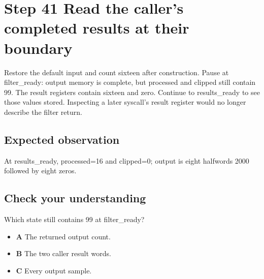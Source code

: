 \section{Step 41 Read the caller’s completed results at their boundary}\label{fir-s41}

Restore the default input and count sixteen after construction. Pause at filter\_ready: output memory is complete, but processed and clipped still contain 99. The result registers contain sixteen and zero. Continue to results\_ready to see those values stored. Inspecting a later syscall’s result register would no longer describe the filter return.

\subsection{Expected observation}
At results\_ready, processed=16 and clipped=0; output is eight halfwords 2000 followed by eight zeros.

\subsection{Check your understanding}
Which state still contains 99 at filter\_ready?

\begin{itemize}
\item \textbf{A} The returned output count.
\item \textbf{B} The two caller result words.
\item \textbf{C} Every output sample.
\end{itemize}

